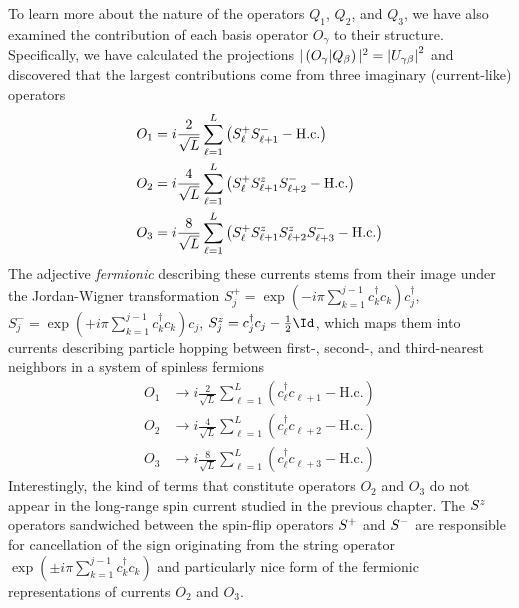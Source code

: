 To learn more about the nature of the operators \(Q_1\), \(Q_2\), and \(Q_3\), we have also
examined the contribution of each basis operator \(O_{\gamma}\) to their structure. Specifically,
we have calculated the projections \(\vert \left(O_{\gamma} \middle| Q_{\beta}\right)\vert^2 = \abs{U_{\gamma\beta}}^2\)
and discovered that the largest contributions come from three imaginary (current-like) operators
{\allowdisplaybreaks
\begin{align}
  O_1 & = i \frac{2}{\sqrt{L}} \sum_{\ell=1}^L \left(S^{+}_{\ell} S^{-}_{\ell+1} - \textrm{H.c.}\right)                      \nonumber     \\
  O_2 & = i \frac{4}{\sqrt{L}} \sum_{\ell=1}^L \left(S^{+}_{\ell} S^{z}_{\ell+1} S^{-}_{\ell+2} - \textrm{H.c.}\right)          \nonumber    \\
  O_3 & = i \frac{8}{\sqrt{L}} \sum_{\ell=1}^L \left(S^{+}_{\ell} S^{z}_{\ell+1} S^{z}_{\ell+2} S^{-}_{\ell+3} - \textrm{H.c.}\right)
  \label{eq:fermionic_currents}
\end{align}
}
The adjective \textit{fermionic} describing these currents stems from their image under the Jordan-Wigner transformation
  \(S_j^{+} =\exp\left(-i \pi \sum_{k=1}^{j-1} c_k^{\dagger} c_k\right) c_j^{\dagger}\), 
  \(S_j^{-} =\exp\left(+i \pi \sum_{k=1}^{j-1} c_k^{\dagger} c_k\right) c_j \), 
 \( S_j^z = c_j^{\dagger} c_j- \frac{1}{2} \Id\),
which maps them into currents describing particle hopping between first-, second-, and third-nearest neighbors in a system
of spinless fermions
\begin{align}
  O_1 & \to i \frac{2}{\sqrt{L}} \sum_{\ell=1}^L \left(c_{\ell}^{\dagger} c_{\ell+1} - \textrm{H.c.}\right) \nonumber\\
  O_2 & \to i \frac{4}{\sqrt{L}} \sum_{\ell=1}^L \left(c_{\ell}^{\dagger} c_{\ell+2} - \textrm{H.c.}\right)\nonumber \\
  O_3 & \to i \frac{8}{\sqrt{L}} \sum_{\ell=1}^L \left(c_{\ell}^{\dagger} c_{\ell+3} - \textrm{H.c.}\right)
\end{align}
Interestingly, the kind of terms that constitute operators \(O_2\) and \(O_3\) do not appear in the
long-range spin current studied in the previous chapter. The \(S^{z}\) operators sandwiched between
the spin-flip operators \(S^{+}\) and \(S^{-}\) are responsible for cancellation of the sign
originating from the string operator \(\exp\left(\pm i \pi \sum_{k=1}^{j-1} c_k^{\dagger} c_k\right)\) 
and particularly nice form of the fermionic representations of currents \(O_2\) and \(O_3\).

